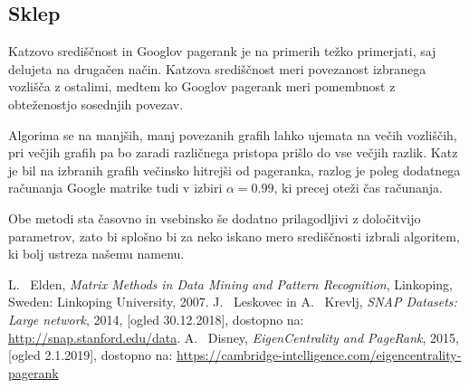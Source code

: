 \documentclass[12pt,a4paper]{amsart}
\begin{document}
\subsection{Sklep}
Katzovo središčnost in Googlov pagerank je na primerih težko primerjati, saj delujeta na drugačen način. Katzova središčnost meri povezanost izbranega vozlišča z ostalimi, medtem ko Googlov pagerank meri pomembnost z obteženostjo sosednjih povezav. 

Algorima se na manjših, manj povezanih grafih lahko ujemata na večih vozliščih, pri večjih grafih pa bo zaradi različnega pristopa prišlo do vse večjih razlik. Katz je bil na izbranih grafih večinsko hitrejši od pageranka, razlog je poleg dodatnega računanja Google matrike tudi v izbiri $\alpha = 0.99$, ki precej oteži čas računanja. 

Obe metodi sta časovno in vsebinsko še dodatno prilagodljivi z določitvijo parametrov, zato bi splošno bi za neko iskano mero središčnosti izbrali algoritem, ki bolj ustreza našemu namenu. 

\begin{thebibliography}{99}
 L. ~Elden, \emph{Matrix Methods in Data Mining and Pattern Recognition}, Linkoping, Sweden: Linkoping University, 2007.
 J. ~Leskovec in A. ~Krevlj, \emph{SNAP Datasets: Large network}, 2014, [ogled 30.12.2018], dostopno na: \url{http://snap.stanford.edu/data}.
 A. ~Disney, \emph{EigenCentrality and PageRank}, 2015, [ogled 2.1.2019], dostopno na: \url{https://cambridge-intelligence.com/eigencentrality-pagerank}
 
\end{thebibliography}
\end{document}
